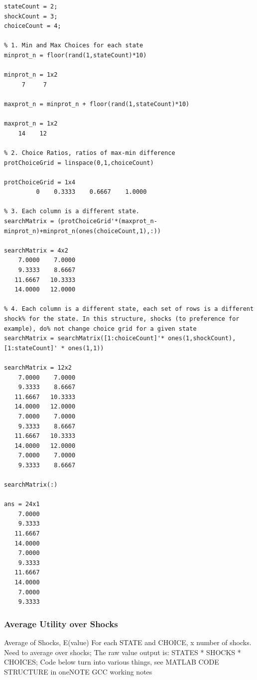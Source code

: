 \documentclass[
]{book}
\begin{document}
\begin{verbatim}
stateCount = 2;
shockCount = 3;
choiceCount = 4;

% 1. Min and Max Choices for each state
minprot_n = floor(rand(1,stateCount)*10)

minprot_n = 1x2    
     7     7

maxprot_n = minprot_n + floor(rand(1,stateCount)*10)

maxprot_n = 1x2    
    14    12

% 2. Choice Ratios, ratios of max-min difference
protChoiceGrid = linspace(0,1,choiceCount)

protChoiceGrid = 1x4    
         0    0.3333    0.6667    1.0000

% 3. Each column is a different state.
searchMatrix = (protChoiceGrid'*(maxprot_n-minprot_n)+minprot_n(ones(choiceCount,1),:))

searchMatrix = 4x2    
    7.0000    7.0000
    9.3333    8.6667
   11.6667   10.3333
   14.0000   12.0000

% 4. Each column is a different state, each set of rows is a different shock% for the state. In this structure, shocks (to preference for example), do% not change choice grid for a given state
searchMatrix = searchMatrix([1:choiceCount]'* ones(1,shockCount), [1:stateCount]' * ones(1,1))

searchMatrix = 12x2    
    7.0000    7.0000
    9.3333    8.6667
   11.6667   10.3333
   14.0000   12.0000
    7.0000    7.0000
    9.3333    8.6667
   11.6667   10.3333
   14.0000   12.0000
    7.0000    7.0000
    9.3333    8.6667

searchMatrix(:)

ans = 24x1    
    7.0000
    9.3333
   11.6667
   14.0000
    7.0000
    9.3333
   11.6667
   14.0000
    7.0000
    9.3333
\end{verbatim}

\hypertarget{average-utility-over-shocks}{%
\subsubsection{\texorpdfstring{\textbf{Average Utility over Shocks}}{Average Utility over Shocks}}\label{average-utility-over-shocks}}

Average of Shocks, E(value) For each STATE and CHOICE, x number of
shocks. Need to average over shocks; The raw value output is: STATES *
SHOCKS * CHOICES; Code below turn into various things, see MATLAB CODE
STRUCTURE in oneNOTE GCC working notes
\end{document}

